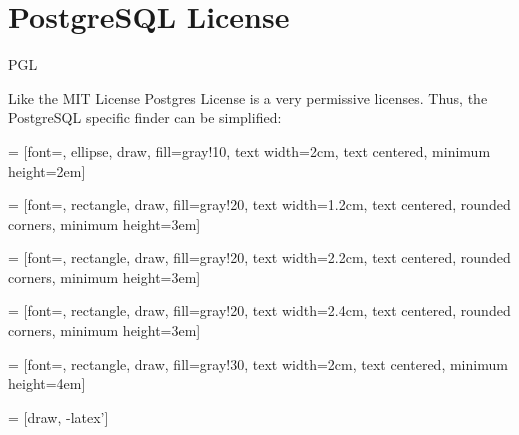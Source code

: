 \section{PostgreSQL License}
\begin{license}{PGL} %

Like the MIT License Postgres License is a very permissive licenses. Thus, the
PostgreSQL specific finder can be simplified:

 = [font=\small, ellipse, draw, fill=gray!10, 
    text width=2cm, text centered, minimum height=2em]

 = [font=\footnotesize, rectangle, draw, fill=gray!20, 
    text width=1.2cm, text centered, rounded corners, minimum height=3em]

 = [font=\footnotesize, rectangle, draw, fill=gray!20, 
    text width=2.2cm, text centered, rounded corners, minimum height=3em]

 = [font=\footnotesize, rectangle, draw, fill=gray!20, 
    text width=2.4cm, text centered, rounded corners, minimum height=3em]
    
 = [font=\tiny, rectangle, draw, fill=gray!30, 
    text width=2cm, text centered, minimum height=4em]

 = [draw, -latex']

\end{license}
